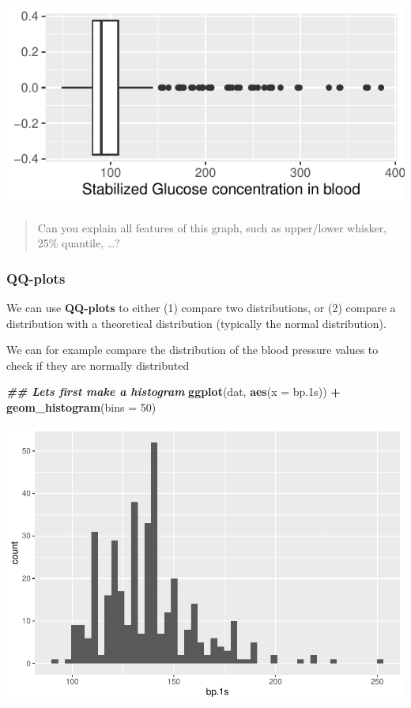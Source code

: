 \documentclass[
]{book}
\newenvironment{Shaded}{\begin{snugshade}}{\end{snugshade}}
\newcommand{\AttributeTok}[1]{\textcolor[rgb]{0.13,0.29,0.53}{#1}}
\newcommand{\DecValTok}[1]{\textcolor[rgb]{0.00,0.00,0.81}{#1}}
\newcommand{\DocumentationTok}[1]{\textcolor[rgb]{0.56,0.35,0.01}{\textbf{\textit{#1}}}}
\newcommand{\FloatTok}[1]{\textcolor[rgb]{0.00,0.00,0.81}{#1}}
\newcommand{\FunctionTok}[1]{\textcolor[rgb]{0.13,0.29,0.53}{\textbf{#1}}}
\newcommand{\NormalTok}[1]{#1}
\newcommand{\SpecialCharTok}[1]{\textcolor[rgb]{0.81,0.36,0.00}{\textbf{#1}}}
\begin{document}
\includegraphics{_main_files/figure-latex/unnamed-chunk-49-1.pdf}

\begin{quote}
Can you explain all features of this graph, such as upper/lower whisker, 25\% quantile, \ldots?
\end{quote}

\hypertarget{qq-plots}{%
\subsubsection{QQ-plots}\label{qq-plots}}

We can use \textbf{QQ-plots} to either (1) compare two distributions, or (2) compare a distribution with a theoretical distribution (typically the normal distribution).

We can for example compare the distribution of the blood pressure values to check if they are normally distributed

\begin{Shaded}
\begin{Highlighting}[]
\DocumentationTok{\#\# Let\textquotesingle{}s first make a histogram}
\FunctionTok{ggplot}\NormalTok{(dat,}
       \FunctionTok{aes}\NormalTok{(}\AttributeTok{x =}\NormalTok{ bp}\FloatTok{.1}\NormalTok{s)) }\SpecialCharTok{+}
  \FunctionTok{geom\_histogram}\NormalTok{(}\AttributeTok{bins =} \DecValTok{50}\NormalTok{)}
\end{Highlighting}
\end{Shaded}

\includegraphics{_main_files/figure-latex/unnamed-chunk-50-1.pdf}
\end{document}
